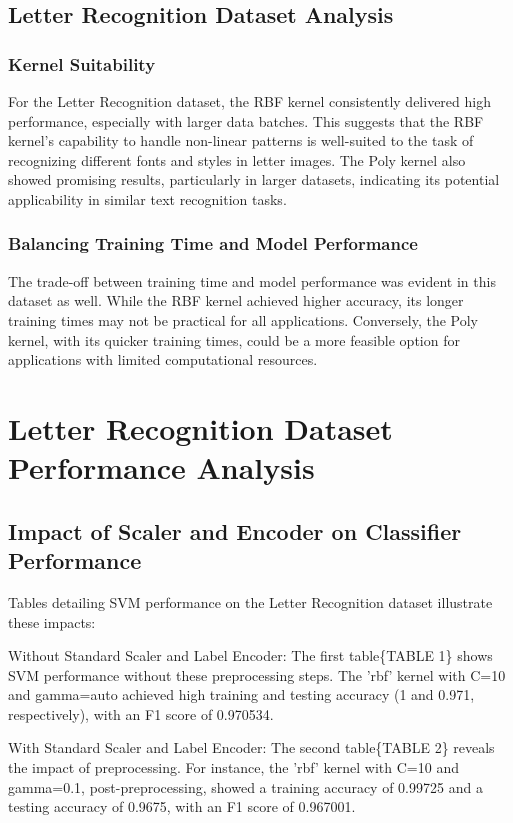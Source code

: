 \documentclass[conference]{IEEEtran}
\begin{document}
\subsection{Letter Recognition Dataset Analysis}

\subsubsection{Kernel Suitability}
For the Letter Recognition dataset, the RBF kernel consistently delivered high performance, especially with larger data batches. This suggests that the RBF kernel's capability to handle non-linear patterns is well-suited to the task of recognizing different fonts and styles in letter images. The Poly kernel also showed promising results, particularly in larger datasets, indicating its potential applicability in similar text recognition tasks.

\subsubsection{Balancing Training Time and Model Performance}
The trade-off between training time and model performance was evident in this dataset as well. While the RBF kernel achieved higher accuracy, its longer training times may not be practical for all applications. Conversely, the Poly kernel, with its quicker training times, could be a more feasible option for applications with limited computational resources.

\section{Letter Recognition Dataset Performance Analysis}


\subsection{Impact of Scaler and Encoder on Classifier Performance}

Tables detailing SVM performance on the Letter Recognition dataset illustrate these impacts:

Without Standard Scaler and Label Encoder: The first table\{TABLE 1\} shows SVM performance without these preprocessing steps. The 'rbf' kernel with C=10 and gamma=auto achieved high training and testing accuracy (1 and 0.971, respectively), with an F1 score of 0.970534.

With Standard Scaler and Label Encoder: The second table\{TABLE 2\} reveals the impact of preprocessing. For instance, the 'rbf' kernel with C=10 and gamma=0.1, post-preprocessing, showed a training accuracy of 0.99725 and a testing accuracy of 0.9675, with an F1 score of 0.967001.
\end{document}
